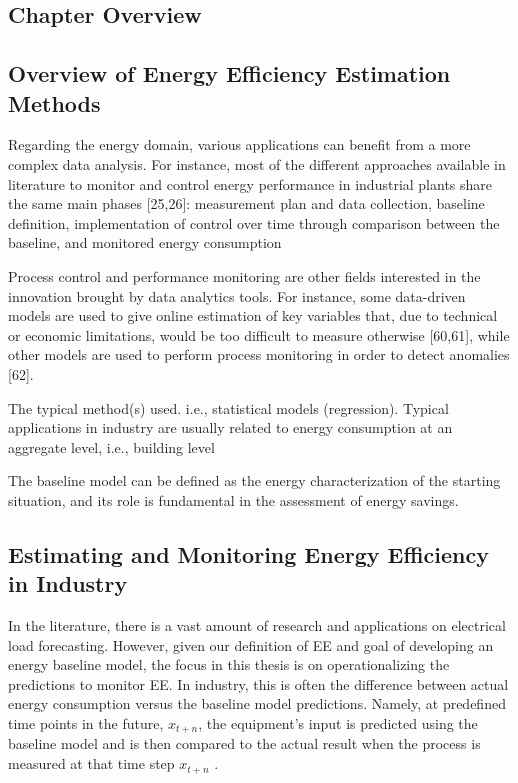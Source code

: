 \subsection{Chapter Overview}

\subsection{Overview of Energy Efficiency Estimation Methods}

Regarding the energy domain, various applications can benefit from a more complex data analysis. For instance, most of the different approaches available in literature to monitor and control energy performance in industrial plants share the same main phases [25,26]: measurement plan and data collection, baseline definition, implementation of control over time through comparison between the baseline, and monitored energy consumption


Process control and performance monitoring are other fields interested in the innovation brought by data analytics tools. For instance, some data-driven models are used to give online estimation of key variables that, due to technical or economic limitations, would be too difficult to measure otherwise [60,61], while other models are used to perform process monitoring in order to detect anomalies [62].

The typical method(s) used. i.e., statistical models (regression). Typical applications in industry are usually related to energy consumption at an aggregate level, i.e., building level

The baseline model can be defined as the energy characterization of the starting situation, and its role is fundamental in the assessment of energy savings. 

\subsection{Estimating and Monitoring Energy Efficiency in Industry}

In the literature, there is a vast amount of research and applications on electrical load forecasting. However, given our definition of EE and goal of developing an energy baseline model, the focus in this thesis is on operationalizing the predictions to monitor EE. In industry, this is often the difference between actual energy consumption versus the baseline model predictions. Namely, at predefined time points in the future, $x_{t+n}$, the equipment's input is predicted using the baseline model and is then compared to the actual result when the process is measured at that time step $x_{t+n}$ \cite{tightening}. 

